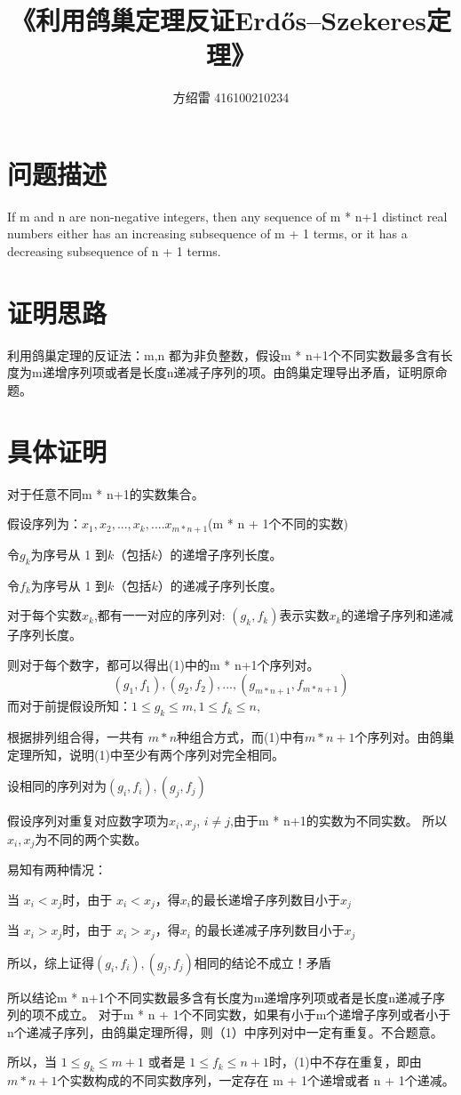\documentclass[]{article}
\title{《利用鸽巢定理反证Erdős–Szekeres定理》}
\author{方绍雷 416100210234}
\begin{document}
\maketitle
\thispagestyle{empty}
\clearpage
\setcounter{page}{1} %
\renewcommand{\abstractname}{问题描述}
\section{问题描述}
If m and n are non-negative integers, then any sequence of
m * n+1 distinct real numbers either has an increasing subsequence of
m + 1 terms, or it has a decreasing subsequence of n + 1 terms.
\section{证明思路}
利用鸽巢定理的反证法：m,n 都为非负整数，假设m * n+1个不同实数最多含有长度为m递增序列项或者是长度n递减子序列的项。由鸽巢定理导出矛盾，证明原命题。
\section{具体证明}
对于任意不同m * n+1的实数集合。

假设序列为：$ x_{1}, x_{2},...,x_{k},....x_{m*n+1} $(m * n + 1个不同的实数)

令$ g_{k} $为序号从 1 到$ k $（包括$ k $）的递增子序列长度。

令$ f_{k} $为序号从 1 到$ k $（包括$ k $）的递减子序列长度。

对于每个实数$ x_{k} $,都有一一对应的序列对: $ (g_{k},f_{k}) $表示实数$ x_{k} $的递增子序列和递减子序列长度。

则对于每个数字，都可以得出(1)中的m * n+1个序列对。
\begin{equation}
	(g_{1},f_{1}),(g_{2},f_{2}),...,(g_{m*n+1},f_{m*n+1})
\end{equation}
而对于前提假设所知：$ 1\leq g_{k} \leq m, 1\leq f_{k} \leq n$,

根据排列组合得，一共有 $ m*n $种组合方式，而(1)中有$ m*n + 1$个序列对。由鸽巢定理所知，说明(1)中至少有两个序列对完全相同。

设相同的序列对为$ (g_{i},f_{i}),(g_{j},f_{j}) $

假设序列对重复对应数字项为$ x_{i}, x_{j}$, $ i \neq j $,由于m * n+1的实数为不同实数。
所以 $ x_{i}, x_{j}$为不同的两个实数。

易知有两种情况：
	
	当 $ x_{i} < x_{j} $时，由于  $ x_{i} < x_{j} $，得$ x_{i} $的最长递增子序列数目小于$ x_{j} $
	
	当 $ x_{i} > x_{j}$时，由于 $ x_{i} > x_{j} $，得$ x_{i} $ 的最长递减子序列数目小于$ x_{j} $
	
	所以，综上证得$ (g_{i},f_{i}),(g_{j},f_{j}) $相同的结论不成立！矛盾

所以结论m * n+1个不同实数最多含有长度为m递增序列项或者是长度n递减子序列的项不成立。
对于m * n + 1个不同实数，如果有小于m个递增子序列或者小于n个递减子序列，由鸽巢定理所得，则（1）中序列对中一定有重复。不合题意。

所以，当 $ 1\leq g_{k} \leq m + 1 $ 或者是 $ 1\leq f_{k} \leq n + 1$时，(1)中不存在重复，即由$ m * n + 1$个实数构成的不同实数序列，一定存在 m + 1个递增或者 n + 1个递减。
\end{document}
